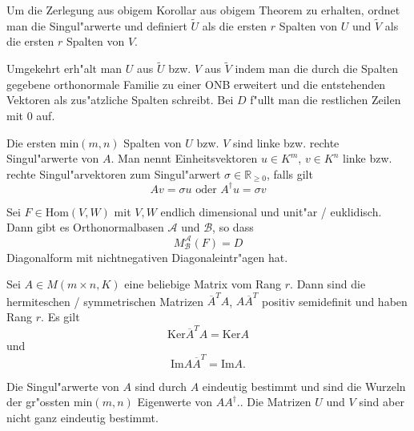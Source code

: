 \documentclass[9pt, a4paper, twocolumn, landscape]{article}
\begin{document}
{\begin{remark}
Um die Zerlegung aus obigem Korollar aus obigem Theorem zu erhalten, ordnet man die Singul"arwerte und definiert $\tilde{U}$ als die ersten $r$ Spalten von $U$ und $\tilde{V}$ als die ersten $r$ Spalten von $V$.

Umgekehrt erh"alt man $U$ aus $\tilde{U}$ bzw. $V$ aus $\tilde{V}$ indem man die durch die Spalten gegebene orthonormale Familie zu einer ONB erweitert und die entstehenden Vektoren als zus"atzliche Spalten schreibt. Bei $D$ f"ullt man die restlichen Zeilen mit $0$ auf.
\end{remark}



\begin{definition}
Die ersten $\mathrm{min}(m, n)$ Spalten von $U$ bzw. $V$ sind linke bzw. rechte Singul"arwerte von $A$. Man nennt Einheitsvektoren $u \in K^m$, $v \in K^n$ linke bzw. rechte Singul"arvektoren zum Singul"arwert $\sigma \in \mathbb{R}_{\geq 0}$, falls gilt
$$
Av = \sigma u \text{ oder } A^\dagger u = \sigma v
$$
\end{definition}

\begin{corollary}
Sei $F \in \mathrm{Hom}(V, W)$ mit $V, W$ endlich dimensional und unit"ar / euklidisch. Dann gibt es Orthonormalbasen $\mathcal{A}$ und $\mathcal{B}$, so dass 
$$
M^\mathcal{A}_\mathcal{B}(F) = D
$$
Diagonalform mit nichtnegativen Diagonaleintr"agen hat.
\end{corollary}

\begin{lemma}
Sei $A \in M (m \times n, K)$ eine beliebige Matrix vom Rang $r$. Dann sind die hermiteschen / symmetrischen Matrizen $\overline{A}^T A$, $A\overline{A}^T$ positiv semidefinit und haben Rang $r$. Es gilt
$$
\mathrm{Ker} \overline{A}^T A = \mathrm{Ker} A
$$
und
$$
\mathrm{Im} A \overline{A}^T = \mathrm{Im} A.
$$
\end{lemma}



\begin{remark}
Die Singul"arwerte von $A$ sind durch $A$ eindeutig bestimmt und sind die Wurzeln der gr"ossten $\mathrm{min}(m, n)$ Eigenwerte von $AA^\dagger$.. Die Matrizen $U$ und $V$ sind aber nicht ganz eindeutig bestimmt.
\end{remark}

}
\end{document}
